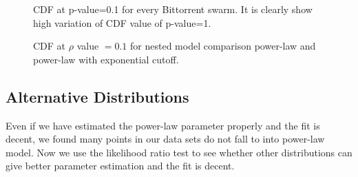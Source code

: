 \documentclass[10pt,conference,letterpaper]{IEEEtran}
\begin{document}
\begin{figure}
\centering
\caption{CDF at p-value=0.1 for every Bittorrent swarm. It is clearly show high variation of CDF value of p-value=1.} 
\label{fig:cdf-p-01}
\end{figure}


\begin{figure}
\centering
{}
\caption{CDF at $\rho$ value $=0.1$  for nested model comparison power-law and power-law with exponential cutoff.} 
\label{fig:cdf-lr}
\end{figure}

\subsection{Alternative Distributions}
Even if we have estimated the power-law parameter properly and the fit is decent, we found many points in our data sets  do not fall to into power-law model.
Now  we use the likelihood ratio test \cite{vuong1989likelihood} to see whether other distributions can give better parameter estimation and the fit is decent.
\end{document}
